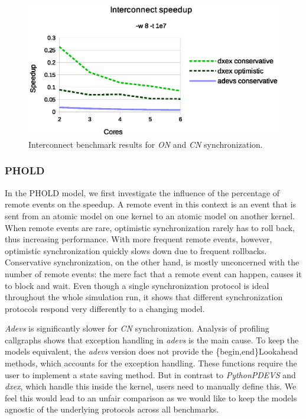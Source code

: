 \begin{figure}
	\center
	\includegraphics[width=\columnwidth]{fig/interconnect_parallel.eps}
	\caption{Interconnect benchmark results for \textit{ON} and \textit{CN} synchronization.}
	\label{fig:interconnect_benchmark_parallel}
\end{figure}

\subsubsection{PHOLD}
In the PHOLD model, we first investigate the influence of the percentage of remote events on the speedup.
A remote event in this context is an event that is sent from an atomic model on one kernel to an atomic model on another kernel.
When remote events are rare, optimistic synchronization rarely has to roll back, thus increasing performance.
With more frequent remote events, however, optimistic synchronization quickly slows down due to frequent rollbacks.
Conservative synchronization, on the other hand, is mostly unconcerned with the number of remote events: the mere fact that a remote event can happen, causes it to block and wait.
Even though a single synchronization protocol is ideal throughout the whole simulation run, it shows that different synchronization protocols respond very differently to a changing model.

\textit{Adevs} is significantly slower for \textit{CN} synchronization.
Analysis of profiling callgraphs shows that exception handling in \textit{adevs} is the main cause. 
To keep the models equivalent, the \textit{adevs} version does not provide the \{begin,end\}Lookahead methods, which accounts for the exception handling.
These functions require the user to implement a state saving method.
But in contrast to \textit{PythonPDEVS} and \textit{dxex}, which handle this inside the kernel, users need to manually define this.
We feel this would lead to an unfair comparison as we would like to keep the models agnostic of the underlying protocols across all benchmarks.

